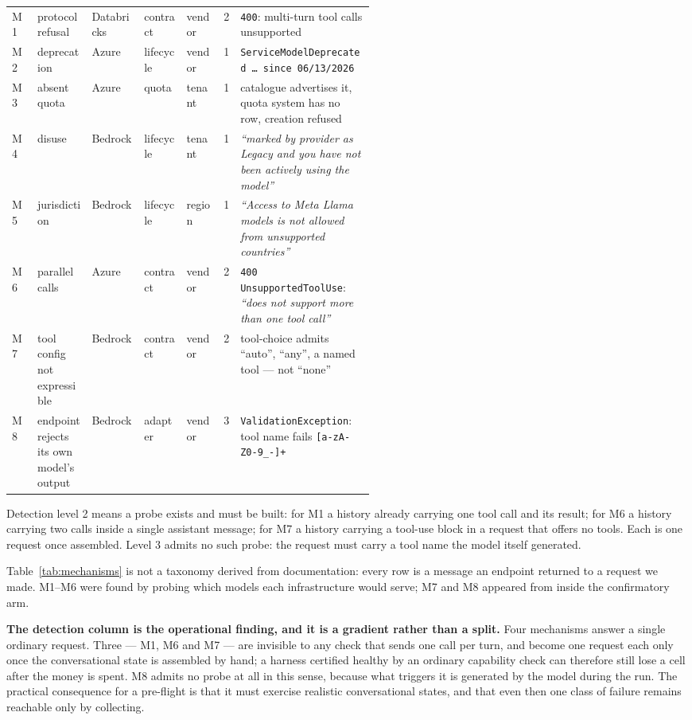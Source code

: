 \begin{table}[!t]
\begin{tabular}{@{}l P{0.155\linewidth} l l l c P{0.375\linewidth}@{}}
\midrule
M1 & protocol refusal & Databricks & contract & vendor & 2 & \texttt{400}: multi-turn tool calls unsupported \\
M2 & deprecation & Azure & lifecycle & vendor & 1 & \texttt{ServiceModelDeprecated \ldots\ since 06/13/2026} \\
M3 & absent quota & Azure & quota & tenant & 1 & catalogue advertises it, quota system has no row, creation refused \\
M4 & disuse & Bedrock & lifecycle & tenant & 1 & \emph{``marked by provider as Legacy and you have not been actively using the model''} \\
M5 & jurisdiction & Bedrock & lifecycle & region & 1 & \emph{``Access to Meta Llama models is not allowed from unsupported countries''} \\
M6 & parallel calls & Azure & contract & vendor & 2 & \texttt{400 UnsupportedToolUse}: \emph{``does not support more than one tool call''} \\
M7 & tool config not expressible & Bedrock & contract & vendor & 2 & tool-choice admits ``auto'', ``any'', a named tool --- not ``none'' \\
M8 & endpoint rejects its own model's output & Bedrock & adapter & vendor & 3 & \texttt{ValidationException}: tool name fails \texttt{[a-zA-Z0-9\_-]+} \\
\bottomrule
\end{tabular}

\vspace{0.3em}
{\footnotesize Detection level 2 means a probe exists and must be built: for M1 a history already carrying
one tool call and its result; for M6 a history carrying two calls inside a single assistant message; for M7
a history carrying a tool-use block in a request that offers no tools. Each is one request once assembled.
Level 3 admits no such probe: the request must carry a tool name the model itself generated.}
\end{table}

Table~\ref{tab:mechanisms} is not a taxonomy derived from documentation: every row is a message an endpoint
returned to a request we made. M1--M6 were found by probing which models each infrastructure would serve;
M7 and M8 appeared from inside the confirmatory arm.

\textbf{The detection column is the operational finding, and it is a gradient rather than a split.} Four
mechanisms answer a single ordinary request. Three --- M1, M6 and M7 --- are invisible to any check that
sends one call per turn, and become one request each only once the conversational state is assembled by
hand; a harness certified healthy by an ordinary capability check can therefore still lose a cell after the
money is spent. M8 admits no probe at all in this sense, because what triggers it is generated by the model
during the run. The practical consequence for a pre-flight is that it must exercise realistic
conversational states, and that even then one class of failure remains reachable only by collecting.

